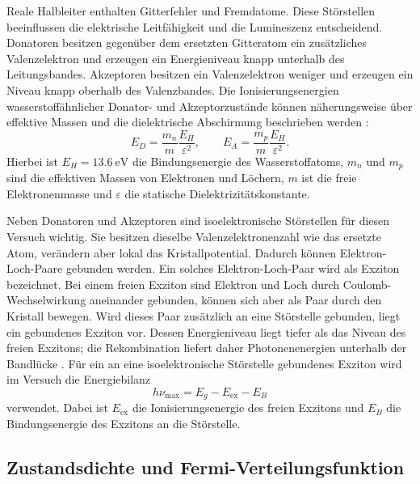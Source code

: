 \documentclass{article}
\begin{document}
Reale Halbleiter enthalten Gitterfehler und Fremdatome. Diese Störstellen beeinflussen die elektrische Leitfähigkeit und die Lumineszenz entscheidend. Donatoren besitzen gegenüber dem ersetzten Gitteratom ein zusätzliches Valenzelektron und erzeugen ein Energieniveau knapp unterhalb des Leitungsbandes. Akzeptoren besitzen ein Valenzelektron weniger und erzeugen ein Niveau knapp oberhalb des Valenzbandes. Die Ionisierungsenergien wasserstoffähnlicher Donator- und Akzeptorzustände können näherungsweise über effektive Massen und die dielektrische Abschirmung beschrieben werden \cite[S.~8--10]{manual}:
\begin{equation}
    E_D = \frac{m_n}{m}\frac{E_H}{\varepsilon^2},
    \qquad
    E_A = \frac{m_p}{m}\frac{E_H}{\varepsilon^2}.
    \label{eq:ionisierungsenergien}
\end{equation}
Hierbei ist $E_H=\SI{13.6}{\electronvolt}$ die Bindungsenergie des Wasserstoffatoms, $m_n$ und $m_p$ sind die effektiven Massen von Elektronen und Löchern, $m$ ist die freie Elektronenmasse und $\varepsilon$ die statische Dielektrizitätskonstante.

Neben Donatoren und Akzeptoren sind isoelektronische Störstellen für diesen Versuch wichtig. Sie besitzen dieselbe Valenzelektronenzahl wie das ersetzte Atom, verändern aber lokal das Kristallpotential. Dadurch können Elektron-Loch-Paare gebunden werden. Ein solches Elektron-Loch-Paar wird als Exziton bezeichnet. Bei einem freien Exziton sind Elektron und Loch durch Coulomb-Wechselwirkung aneinander gebunden, können sich aber als Paar durch den Kristall bewegen. Wird dieses Paar zusätzlich an eine Störstelle gebunden, liegt ein gebundenes Exziton vor. Dessen Energieniveau liegt tiefer als das Niveau des freien Exzitons; die Rekombination liefert daher Photonenenergien unterhalb der Bandlücke \cite[S.~10--11]{manual}. Für ein an eine isoelektronische Störstelle gebundenes Exziton wird im Versuch die Energiebilanz
\begin{equation}
    h\nu_\mathrm{max}=E_g-E_\mathrm{ex}-E_B
    \label{eq:exzitonbilanz}
\end{equation}
verwendet. Dabei ist $E_\mathrm{ex}$ die Ionisierungsenergie des freien Exzitons und $E_B$ die Bindungsenergie des Exzitons an die Störstelle.

\subsection{Zustandsdichte und Fermi-Verteilungsfunktion}
\end{document}
